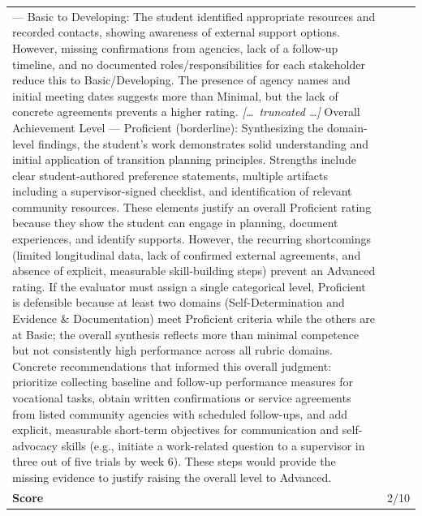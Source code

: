 \begin{longtable}{@{}l p{13cm}@{}}
--- Basic to Developing: The student identified appropriate resources and recorded contacts, showing awareness of external support options. However, missing confirmations from agencies, lack of a follow-up timeline, and no documented roles/responsibilities for each stakeholder reduce this to Basic/Developing. The presence of agency names and initial meeting dates suggests more than Minimal, but the lack of concrete agreements prevents a higher rating. \newline \textit{[\ldots\ truncated \ldots]} \newline Overall Achievement Level --- Proficient (borderline): Synthesizing the domain-level findings, the student's work demonstrates solid understanding and initial application of transition planning principles. Strengths include clear student-authored preference statements, multiple artifacts including a supervisor-signed checklist, and identification of relevant community resources. These elements justify an overall Proficient rating because they show the student can engage in planning, document experiences, and identify supports. \newline However, the recurring shortcomings (limited longitudinal data, lack of confirmed external agreements, and absence of explicit, measurable skill-building steps) prevent an Advanced rating. If the evaluator must assign a single categorical level, Proficient is defensible because at least two domains (Self-Determination and Evidence \& Documentation) meet Proficient criteria while the others are at Basic; the overall synthesis reflects more than minimal competence but not consistently high performance across all rubric domains. \newline Concrete recommendations that informed this overall judgment: prioritize collecting baseline and follow-up performance measures for vocational tasks, obtain written confirmations or service agreements from listed community agencies with scheduled follow-ups, and add explicit, measurable short-term objectives for communication and self-advocacy skills (e.g., initiate a work-related question to a supervisor in three out of five trials by week 6). These steps would provide the missing evidence to justify raising the overall level to Advanced.      \\
  \textbf{Score}     & 2/10  \\

\end{longtable}
